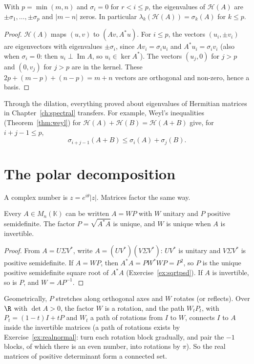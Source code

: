 \begin{proposition}\label{prop:dilation}
With $p=\min(m,n)$ and $\sigma_i=0$ for $r<i\le p$, the eigenvalues of $\mathcal H(A)$ are $\pm\sigma_1,\dots,\pm\sigma_p$ and
$|m-n|$ zeros. In particular $\lambda_k(\mathcal H(A))=\sigma_k(A)$ for $k\le p$.
\end{proposition}
\begin{proof}
$\mathcal H(A)$ maps $(u,v)$ to $(Av,A^*u)$. For $i\le p$, the vectors $(u_i,\pm v_i)$ are eigenvectors with eigenvalues
$\pm\sigma_i$, since $Av_i=\sigma_iu_i$ and $A^*u_i=\sigma_iv_i$ (also when $\sigma_i=0$: then $u_i\perp\operatorname{Im}A$, so
$u_i\in\ker A^*$). The vectors $(u_j,0)$ for $j>p$ and $(0,v_j)$ for $j>p$ are in the kernel. These $2p+(m-p)+(n-p)=m+n$
vectors are orthogonal and non-zero, hence a basis.
\end{proof}

Through the dilation, everything proved about eigenvalues of Hermitian matrices in Chapter~\ref{ch:spectral} transfers. For
example, Weyl's inequalities (Theorem~\ref{thm:weyl}) for $\mathcal H(A)+\mathcal H(B)=\mathcal H(A+B)$ give, for $i+j-1\le
p$,
\begin{equation}\label{eq:weylsv}
\sigma_{i+j-1}(A+B)\le\sigma_i(A)+\sigma_j(B).
\end{equation}

\section{The polar decomposition}

A complex number is $z=e^{i\theta}|z|$. Matrices factor the same way.

\begin{theorem}\label{thm:polar}
Every $A\in M_n(\mathbb K)$ can be written $A=WP$ with $W$ unitary and $P$ positive semidefinite. The factor
$P=\sqrt{A^*A}$ is unique, and $W$ is unique when $A$ is invertible.
\end{theorem}
\begin{proof}
From $A=U\Sigma V^*$, write $A=(UV^*)(V\Sigma V^*)$: $UV^*$ is unitary and $V\Sigma V^*$ is positive semidefinite. If $A=WP$, then
$A^*A=PW^*WP=P^2$, so $P$ is the unique positive semidefinite square root of $A^*A$ (Exercise~\ref{ex:sqrtpsd}). If $A$ is
invertible, so is $P$, and $W=AP^{-1}$.
\end{proof}

Geometrically, $P$ stretches along orthogonal axes and $W$ rotates (or reflects). Over $\R$ with $\det A>0$, the factor
$W$ is a rotation, and the path $W_tP_t$, with $P_t=(1-t)I+tP$ and $W_t$ a path of rotations from $I$ to $W$, connects $I$ to
$A$ inside the invertible matrices (a path of rotations exists by Exercise~\ref{ex:realnormal}: turn each rotation block
gradually, and pair the $-1$ blocks, of which there is an even number, into rotations by $\pi$). So the real matrices of
positive determinant form a connected set.

